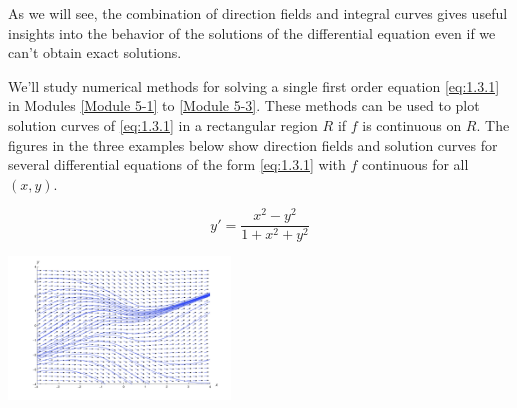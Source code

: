 \documentclass{ximera}
\begin{document}

As we will  see, the combination of  direction fields and
 integral curves gives  useful insights into the behavior of
the solutions of the differential equation even if
we can't obtain exact solutions.

We'll study numerical methods for solving a single first order
equation \eqref{eq:1.3.1} in Modules \ref{Module 5-1} to \ref{Module 5-3}. These methods can be
used
to plot solution curves of \eqref{eq:1.3.1} in a rectangular region $R$ if $f$ is continuous on $R$. The figures in the three examples below show direction fields and solution
curves for several differential equations of the form \eqref{eq:1.3.1} with $f$
 continuous for all $(x,y)$.
 \begin{example}\label{ex:fig010302}
$$
 y'=\frac{x^2-y^2}{1+x^2+y^2}
 $$
 \begin{image}
  \includegraphics[height=1.5in]{fig010302.jpg}
\end{image}
\end{example}
\end{document}
